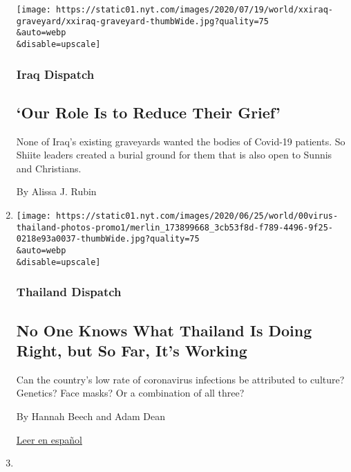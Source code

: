 \begin{enumerate}
  \texttt{[image: https://static01.nyt.com/images/2020/07/19/world/xxiraq-graveyard/xxiraq-graveyard-thumbWide.jpg?quality=75\\\&auto=webp\\\&disable=upscale]}

  \hypertarget{iraq-dispatch}{%
  \subsubsection{Iraq Dispatch}\label{iraq-dispatch}}

  \hypertarget{our-role-is-to-reduce-their-grief}{%
  \subsection{`Our Role Is to Reduce Their
  Grief'}\label{our-role-is-to-reduce-their-grief}}

  None of Iraq's existing graveyards wanted the bodies of Covid-19
  patients. So Shiite leaders created a burial ground for them that is
  also open to Sunnis and Christians.

  By Alissa J. Rubin
\item
  \href{/2020/07/16/world/asia/coronavirus-thailand-photos.html}{}

  \texttt{[image: https://static01.nyt.com/images/2020/06/25/world/00virus-thailand-photos-promo1/merlin\_173899668\_3cb53f8d-f789-4496-9f25-0218e93a0037-thumbWide.jpg?quality=75\\\&auto=webp\\\&disable=upscale]}

  \hypertarget{thailand-dispatch-1}{%
  \subsubsection{Thailand Dispatch}\label{thailand-dispatch-1}}

  \hypertarget{no-one-knows-what-thailand-is-doing-right-but-so-far-its-working}{%
  \subsection{No One Knows What Thailand Is Doing Right, but So Far,
  It's
  Working}\label{no-one-knows-what-thailand-is-doing-right-but-so-far-its-working}}

  Can the country's low rate of coronavirus infections be attributed to
  culture? Genetics? Face masks? Or a combination of all three?

  By Hannah Beech and Adam Dean

  \href{https://www.nytimes.com/es/2020/07/21/espanol/mundo/coronavirus-tailandia.html}{Leer
  en español}
\item
  \href{/2020/07/12/world/middleeast/beirut-lebanon-economic-crisis.html}{}


\end{enumerate}
